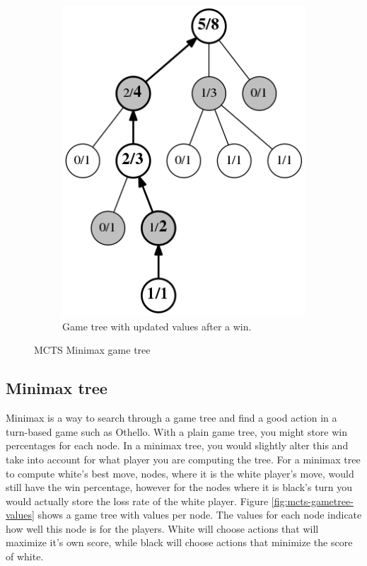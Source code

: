 \documentclass[11pt,a4paper]{article}
\begin{document}
\begin{figure}
\begin{subfigure}{0.23\textwidth}
		\includegraphics[width=\textwidth]{images/gametree-values-updated}
		\caption{Game tree with updated values after a win.}
		\label{fig:mcts-gametree-values-updated}
	\end{subfigure}
	\caption{MCTS Minimax game tree}
\end{figure}

\subsection{Minimax tree}
Minimax is a way to search through a game tree and find a good action in a turn-based game such as Othello. With a plain game tree, you might store win percentages for each node. In a minimax tree, you would slightly alter this and take into account for what player you are computing the tree. For a minimax tree to compute white's best move, nodes, where it is the white player's move, would still have the win percentage, however for the nodes where it is black's turn you would actually store the loss rate of the white player. Figure \ref{fig:mcts-gametree-values} shows a game tree with values per node. The values for each node indicate how well this node is for the players. White will choose actions that will maximize it's own score, while black will choose actions that minimize the score of white.
\end{document}
